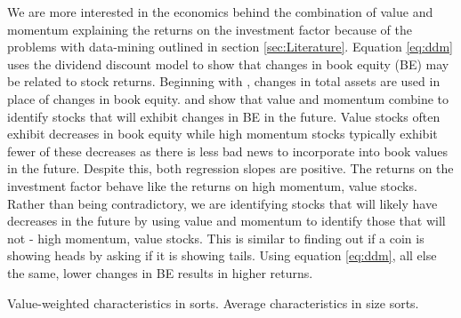 We are more interested in the economics behind the combination of value and momentum
explaining the returns on the investment factor because of the problems with data-mining
outlined in section \ref{sec:Literature}. Equation \ref{eq:ddm} uses the dividend discount
model to show that changes in book equity (BE) may be related to stock returns. Beginning
with \parencite{fama2006profitability}, changes in total assets are used in place of
changes in book equity. \textcite{kok2017facts} and \textcite{asness2013devil} show that
value and momentum combine to identify stocks that will exhibit changes in BE in the
future. Value stocks often exhibit decreases in book equity while high momentum stocks
typically exhibit fewer of these decreases as there is less bad news to incorporate into
book values in the future. Despite this, both regression slopes are positive. The returns
on the investment factor behave like the returns on high momentum, value stocks. Rather
than being contradictory, we are identifying stocks that will likely have decreases in the
future by using value and momentum to identify those that will not - high momentum, value
stocks. This is similar to finding out if a coin is showing heads by asking if it is
showing tails. Using equation \ref{eq:ddm}, all else the same, lower changes in BE results
in higher returns.


Value-weighted characteristics in sorts. Average characteristics in size sorts.
